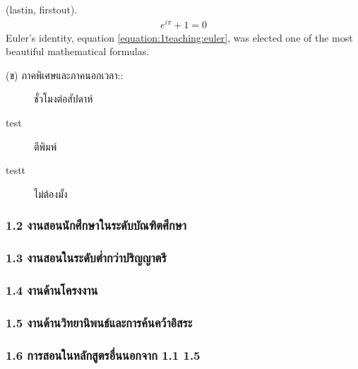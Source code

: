 \documentclass[a4paper,12pt,english]{sphinxmanual}
\begin{document}
 (last\sphinxhyphen{}in, first\sphinxhyphen{}out).
\begin{equation}\label{equation:1teaching:euler}
\begin{split}e^{i\pi} + 1 = 0\end{split}
\end{equation}
Euler's identity, equation \eqref{equation:1teaching:euler}, was elected one of the
most beautiful mathematical formulas.
\begin{description}
\item[{(ข) ภาคพิเศษและภาคนอกเวลา::}]  ชั่วโมงต่อสัปดาห์

\end{description}
\begin{description}
\item[{test\label{\detokenize{1teaching:term-test}}}] \leavevmode
ตีพิมพ์

\item[{testt\label{\detokenize{1teaching:term-testt}}}] \leavevmode
ไม่ต้องมั้ง

\end{description}


\subsubsection{1.2 งานสอนนักศึกษาในระดับบัณฑิตศึกษา}
\label{\detokenize{1teaching:id4}}

\subsubsection{1.3 งานสอนในระดับต่ำกว่าปริญญาตรี}
\label{\detokenize{1teaching:id5}}

\subsubsection{1.4 งานด้านโครงงาน}
\label{\detokenize{1teaching:id6}}

\subsubsection{1.5 งานด้านวิทยานิพนธ์และการค้นคว้าอิสระ}
\label{\detokenize{1teaching:id7}}

\subsubsection{1.6 การสอนในหลักสูตรอื่นนอกจาก 1.1 \sphinxhyphen{} 1.5}
\label{\detokenize{1teaching:id8}}
\end{document}
